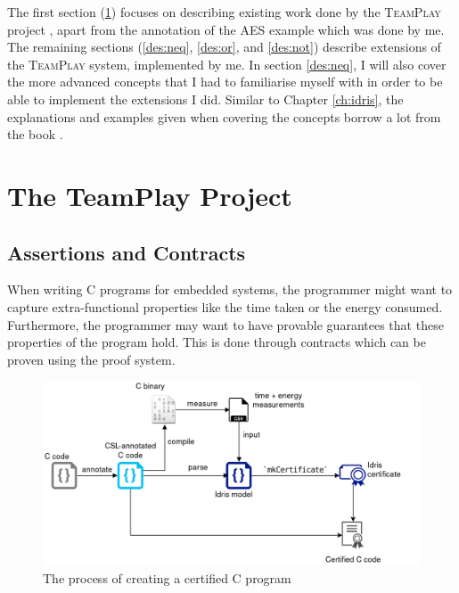 The first section (\ref{des:tp-dsl}) focuses on describing existing work done by the \textsc{TeamPlay} project \cite{teamplay:d1.1}, apart from the annotation of the AES example which was done by me. The remaining sections (\ref{des:neq}, \ref{des:or}, and \ref{des:not}) describe extensions of the \textsc{TeamPlay} system, implemented by me. In section \ref{des:neq}, I will also cover the more advanced \Idris concepts that I had to familiarise myself with in order to be able to implement the extensions I did. Similar to Chapter \ref{ch:idris}, the explanations and examples given when covering the concepts borrow a lot from the \Idris book \cite{brady_2017}.


\section{The TeamPlay Project}\label{des:tp-dsl}
    \subsection{Assertions and Contracts}
        When writing C programs for embedded systems, the programmer might want to capture extra-functional properties like the time taken or the energy consumed. Furthermore, the programmer may want to have provable guarantees that these properties of the program hold. This is done through contracts which can be proven using the \Idris proof system.
        
        \begin{figure}
            \centering
            \includegraphics[width=\textwidth]{diagrams/process.png}
            \caption{The process of creating a certified C program}
        \end{figure}
        
